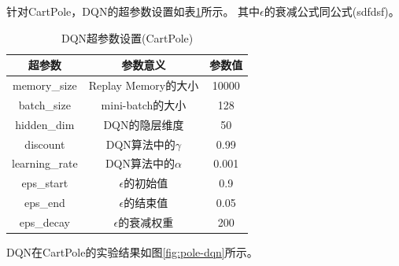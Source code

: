 \documentclass[a4paper,UTF8]{article}
\theoremstyle{definition}
\begin{document}
针对CartPole，DQN的超参数设置如表\ref{tab:pole-dqn}所示。
其中$\epsilon$的衰减公式同公式(sdfdsf)。

\begin{table}[htbp]
	\centering
	\begin{tabular}{ccc}
		\toprule
		超参数 & 参数意义 & 参数值 \\
		\midrule
		memory\_size & Replay Memory的大小 & 10000 \\
		batch\_size & mini-batch的大小 & 128 \\
		hidden\_dim & DQN的隐层维度 & 50 \\
		discount & DQN算法中的$\gamma$ & 0.99 \\
		learning\_rate & DQN算法中的$\alpha$ & 0.001 \\
		eps\_start & $\epsilon$的初始值 & 0.9 \\
		eps\_end & $\epsilon$的结束值 & 0.05 \\
		eps\_decay & $\epsilon$的衰减权重 & 200 \\
		\bottomrule
	\end{tabular}
	\caption{DQN超参数设置(CartPole)}\label{tab:pole-dqn}
\end{table}

DQN在CartPole的实验结果如图\ref{fig:pole-dqn}所示。
\end{document}
